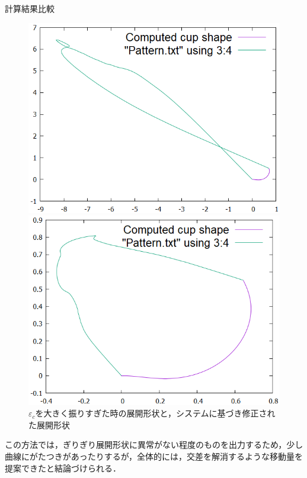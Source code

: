 \documentclass[11pt]{jsarticle}
\begin{document}
			計算結果比較
			\begin{figure}
				\begin{minipage}{0.5\hsize}
					\centering
					\includegraphics[width = \columnwidth]{./figure/CrossingData/Patt.png}
				\end{minipage}
				\begin{minipage}{0.5\hsize}
					\centering
					\includegraphics[width = \columnwidth]{./figure/test2/Patt.png}
				\end{minipage}
				\caption{$ \varepsilon_c $を大きく振りすぎた時の展開形状と，システムに基づき修正された展開形状}
			\end{figure}
			この方法では，ぎりぎり展開形状に異常がない程度のものを出力するため，少し曲線にがたつきがあったりするが，全体的には，交差を解消するような移動量を提案できたと結論づけられる．
	\newpage
\vspace{10cm}
	

\vspace{14cm}
	\articleSPRfour
	\articleSPRfive
\end{document}
